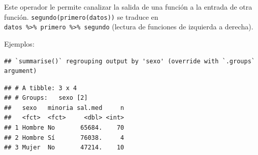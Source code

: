 \documentclass[
]{book}
\newenvironment{Shaded}{\begin{snugshade}}{\end{snugshade}}
\newcommand{\DataTypeTok}[1]{\textcolor[rgb]{0.13,0.29,0.53}{#1}}
\newcommand{\DecValTok}[1]{\textcolor[rgb]{0.00,0.00,0.81}{#1}}
\newcommand{\KeywordTok}[1]{\textcolor[rgb]{0.13,0.29,0.53}{\textbf{#1}}}
\newcommand{\NormalTok}[1]{#1}
\newcommand{\OperatorTok}[1]{\textcolor[rgb]{0.81,0.36,0.00}{\textbf{#1}}}
\newcommand{\StringTok}[1]{\textcolor[rgb]{0.31,0.60,0.02}{#1}}
\begin{document}
Este operador le permite canalizar la salida de una función a la entrada de otra función.
\texttt{segundo(primero(datos))} se traduce en \texttt{datos\ \%\textgreater{}\%\ primero\ \%\textgreater{}\%\ segundo}
(lectura de funciones de izquierda a derecha).

Ejemplos:

\begin{Shaded}
\end{Shaded}

\begin{verbatim}
## `summarise()` regrouping output by 'sexo' (override with `.groups` argument)
\end{verbatim}

\begin{verbatim}
## # A tibble: 3 x 4
## # Groups:   sexo [2]
##   sexo   minoria sal.med     n
##   <fct>  <fct>     <dbl> <int>
## 1 Hombre No       65684.    70
## 2 Hombre Sí       76038.     4
## 3 Mujer  No       47214.    10
\end{verbatim}

\begin{Shaded}
\end{Shaded}
\end{document}
